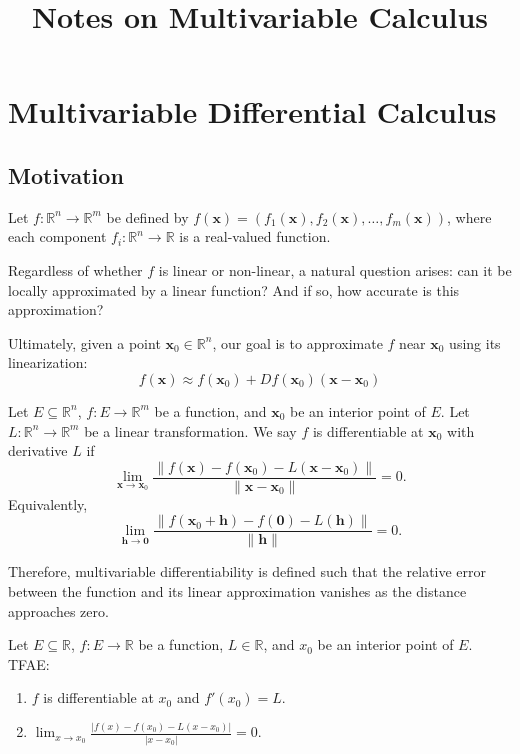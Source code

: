 \documentclass[12pt]{article}
\begin{document}
\title{Notes on Multivariable Calculus}
\author{}
\date{}
\maketitle

\section{Multivariable Differential Calculus}

\subsection*{Motivation}
Let $f: \mathbb{R}^n \to \mathbb{R}^m$ be defined by $f(\mathbf{x})=(f_1(\mathbf{x}), f_2(\mathbf{x}), \dots, f_m(\mathbf{x}))$, where each component $f_i: \mathbb{R}^n \to \mathbb{R}$ is a real-valued function. 

Regardless of whether $f$ is linear or non-linear, a natural question arises: can it be locally approximated by a linear function? And if so, how accurate is this approximation?

Ultimately, given a point $\mathbf{x}_0 \in \mathbb{R}^n$, our goal is to approximate $f$ near $\mathbf{x}_0$ using its linearization:
$$f(\mathbf{x}) \approx f(\mathbf{x}_0) + Df(\mathbf{x}_0) (\mathbf{x} - \mathbf{x}_0)$$


\begin{definition}[Differentiability]
Let $E \subseteq \mathbb{R}^n$, $f: E \to \mathbb{R}^m$ be a function, and $\mathbf{x}_0$ be an interior point of $E$. Let $L: \mathbb{R}^n \to \mathbb{R}^m$ be a linear transformation. We say $f$ is differentiable at $\mathbf{x}_0$ with derivative $L$ if 
$$\lim_{\mathbf{x} \to \mathbf{x}_0} \frac{\|f(\mathbf{x}) - f(\mathbf{x}_0) - L(\mathbf{x}-\mathbf{x}_0)\|}{\|\mathbf{x}-\mathbf{x}_0\|} = 0.$$
Equivalently,
$$\lim_{\mathbf{h}\to\mathbf{0}}\frac{\| f(\mathbf{x}_0+\mathbf{h})-f(\mathbf{0})-L(\mathbf{h}) \|}{\|\mathbf{h}\|}=0.$$
\label{differentiablity}
\end{definition}

Therefore, multivariable differentiability is defined such that the relative error between the function and its linear approximation vanishes as the distance approaches zero.

\begin{theorem}
Let $E \subseteq \mathbb{R}$, $f: E \to \mathbb{R}$ be a function, $L \in \mathbb{R}$, and $x_0$ be an interior point of $E$. TFAE:
\begin{enumerate}
    \item $f$ is differentiable at $x_0$ and $f'(x_0) = L$.
    \item $\lim_{x \to x_0} \frac{|f(x) - f(x_0) - L(x - x_0)|}{|x - x_0|} = 0$.
\end{enumerate}
\end{theorem}
\end{document}
